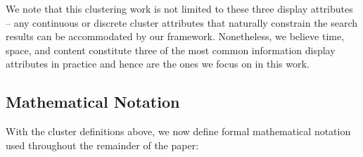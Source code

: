 We note that this clustering work is not limited to these three display attributes -- any continuous or discrete cluster attributes that naturally constrain the search results can be accommodated by our framework.  Nonetheless, we believe time, space, and content constitute three of the most common information display attributes in practice and hence are the ones we focus on in this work.

\subsection{Mathematical Notation}

With the cluster definitions above, we now define  formal mathematical notation used throughout the remainder of the paper:

